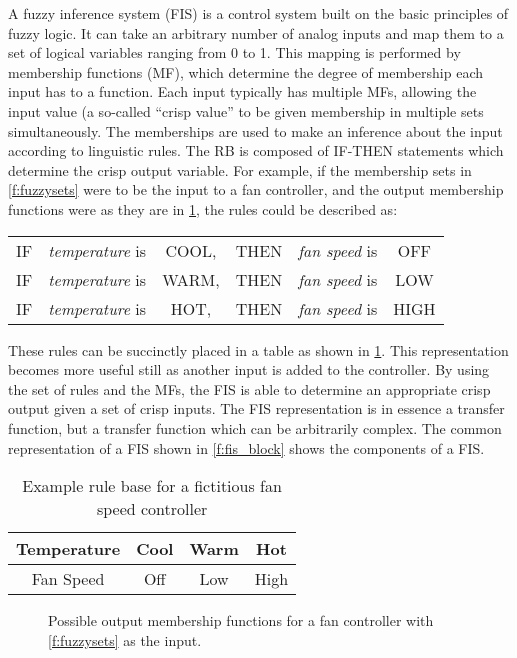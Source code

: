 A fuzzy inference system (FIS) is a control system built on the basic principles of fuzzy
logic\cite{kosko:91bk}\cite{kosko:93sciam}. It can take an arbitrary number of analog inputs and map them to a
set of logical variables ranging from 0 to 1. This mapping is performed by membership functions (MF), which
determine the degree of membership each input has to a function. Each input typically has multiple MFs,
allowing the input value (a so-called ``crisp value'' to be given membership in multiple sets simultaneously.
The memberships are used to make an inference about the input according to linguistic rules.  The RB is
composed of IF-THEN statements which determine the crisp output variable. For example, if the membership sets
in \cref{f:fuzzysets} were to be the input to a fan controller, and the output membership functions were as
they are in \cref{f:outputfan}, the rules could be described as:

\vspace{2em}
\begin{tabular}{cccccc}
        IF &  \emph{temperature} is & COOL, & THEN & \emph{fan speed} is & OFF\\
        IF &  \emph{temperature} is & WARM, & THEN & \emph{fan speed} is & LOW\\
        IF &  \emph{temperature} is & HOT,  & THEN & \emph{fan speed} is & HIGH
\end{tabular}
\vspace{2em}

These rules can be succinctly placed in a table as shown in \cref{t:fanspeed}. This representation becomes
more useful still as another input is added to the controller. By using the set of rules and the MFs, the FIS
is able to determine an appropriate crisp output given a set of crisp inputs. The FIS representation is in
essence a transfer function, but a transfer function which can be arbitrarily complex. The common
representation of a FIS shown in \cref{f:fis_block} shows the components of a FIS.

\begin{table}[ht]
    \centering
    \caption{Example rule base for a fictitious fan speed controller}\label{t:fanspeed}
    \begin{tabular}{c|c|c|c}
        Temperature & Cool & Warm & Hot\\\hline
        Fan Speed & Off & Low & High
    \end{tabular}
\end{table}

\begin{figure}[ht]
    \centering
    
    \caption{Possible output membership functions for a fan controller with \cref{f:fuzzysets} as the
    input.}\label{f:outputfan}
\end{figure}

